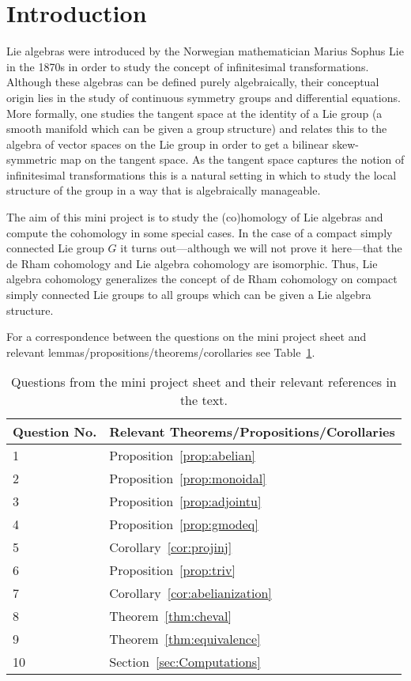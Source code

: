 \section{Introduction} %
\label{sec:Introduction}
Lie algebras were introduced by the Norwegian mathematician Marius Sophus Lie in the 1870s in order to study the concept of infinitesimal transformations. Although these algebras can be defined purely algebraically, their conceptual origin lies in the study of continuous symmetry groups and differential equations. More formally, one studies the tangent space at the identity of a Lie group (a smooth manifold which can be given a group structure) and relates this to the algebra of vector spaces on the Lie group in order to get a bilinear skew-symmetric map on the tangent space. As the tangent space captures the notion of infinitesimal transformations this is a natural setting in which to study the local structure of the group in a way that is algebraically manageable.

The aim of this mini project is to study the (co)homology of Lie algebras and compute the cohomology in some special cases. In the case of a compact simply connected Lie group $ G $ it turns out---although we will not prove it here---that the de Rham cohomology and Lie algebra cohomology are isomorphic. Thus, Lie algebra cohomology generalizes the concept of de Rham cohomology on compact simply connected Lie groups to all groups which can be given a Lie algebra structure.

For a correspondence between the questions on the mini project sheet and relevant lemmas/propositions/theorems/corollaries see Table~\ref{table:exercises}.

\begin{table}[t]
\centering
\begin{tabular}{ | p{2cm} | p{9cm} | }
\hline
Question No. & Relevant Theorems/Propositions/Corollaries \\
\hline
1 & Proposition~\ref{prop:abelian}\\
\hline
2 & Proposition~\ref{prop:monoidal} \\
\hline
3 & Proposition~\ref{prop:adjointu}\\
\hline
4 & Proposition~\ref{prop:gmodeq}\\
\hline
5 & Corollary~\ref{cor:projinj}\\
\hline
6 & Proposition~\ref{prop:triv} \\
\hline
7 & Corollary~\ref{cor:abelianization} \\
\hline
8 & Theorem~\ref{thm:cheval}\\
\hline
9 & Theorem~\ref{thm:equivalence} \\
\hline
10 & Section~\ref{sec:Computations}\\
\hline
\end{tabular}
\caption{Questions from the mini project sheet and their relevant references in the text.}
\label{table:exercises}
\end{table}
